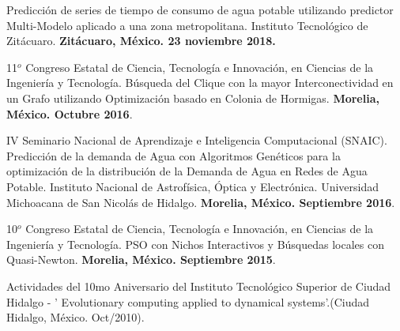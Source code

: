 \documentclass[10pt]{article}
\newenvironment{innerlist}[1][\enskip\textbullet]%
        {\begin{compactitem}[#1]}{\end{compactitem}}
\begin{document}
\begin{innerlist}
\item Predicción de series de tiempo de consumo de agua potable utilizando predictor Multi-Modelo aplicado a una zona metropolitana. Instituto Tecnológico de Zitácuaro. \textbf{Zitácuaro, México. 23 noviembre 2018.}

\item 11$^o$ Congreso Estatal de Ciencia, Tecnología e Innovación, en  Ciencias de la Ingeniería y Tecnología. Búsqueda del Clique con la mayor Interconectividad en un Grafo utilizando Optimización basado en Colonia de Hormigas. \textbf{Morelia, México. Octubre 2016}.

\item IV Seminario Nacional de Aprendizaje e Inteligencia Computacional (SNAIC). Predicción de la demanda de Agua con Algoritmos Genéticos para la optimización de la distribución de la Demanda de Agua en Redes de Agua Potable. Instituto Nacional de Astrofísica, Óptica y Electrónica. Universidad Michoacana de San Nicolás de Hidalgo. \textbf{Morelia, México. Septiembre 2016}.

 \item 10$^o$ Congreso Estatal de Ciencia, Tecnología e Innovación, en  Ciencias de la Ingeniería y Tecnología. PSO con Nichos Interactivos y B\'{u}squedas locales con Quasi-Newton. \textbf{Morelia, México. Septiembre 2015}.
 
 \item Actividades del 10mo Aniversario del  Instituto Tecnológico Superior de Ciudad Hidalgo - ' Evolutionary computing applied to dynamical systems'.(Ciudad Hidalgo, México. Oct/2010).
\end{innerlist} 
\end{document}
